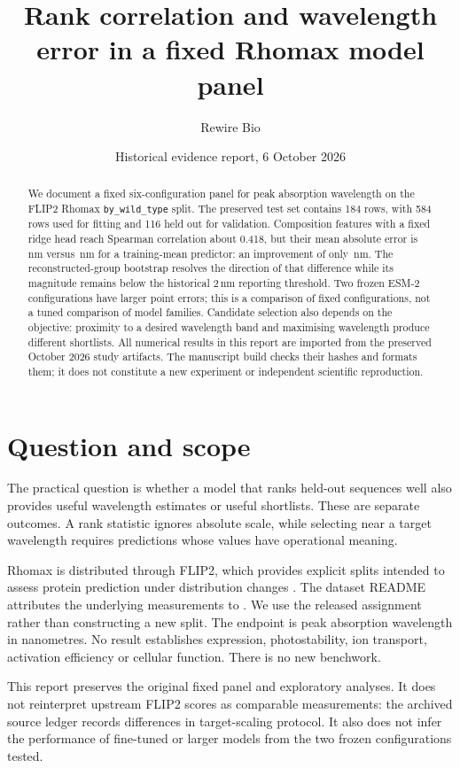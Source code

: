 \documentclass[11pt]{article}
\title{Rank correlation and wavelength error in a fixed Rhomax model panel}
\author{Rewire Bio}
\date{Historical evidence report, 6 October 2026}
\begin{document}
\maketitle
\begin{abstract}
We document a fixed six-configuration panel for peak absorption wavelength on the
FLIP2 Rhomax \texttt{by\_wild\_type} split. The preserved test set contains 184 rows,
with 584 rows used for fitting and 116 held out for validation. Composition features
with a fixed ridge head reach Spearman correlation about 0.418, but their mean
absolute error is \CompMAE\,nm versus \MeanMAE\,nm for a training-mean predictor:
an improvement of only \GainMAE\,nm. The reconstructed-group bootstrap resolves
the direction of that difference while its magnitude remains below the historical
2\,nm reporting threshold. Two frozen ESM-2 configurations have larger point errors;
this is a comparison of fixed configurations, not a tuned comparison of model
families. Candidate selection also depends on the objective: proximity to a desired
wavelength band and maximising wavelength produce different shortlists. All numerical
results in this report are imported from the preserved October 2026 study artifacts.
The manuscript build checks their hashes and formats them; it does not constitute
a new experiment or independent scientific reproduction.
\end{abstract}

\section{Question and scope}
The practical question is whether a model that ranks held-out sequences well also
provides useful wavelength estimates or useful shortlists. These are separate outcomes.
A rank statistic ignores absolute scale, while selecting near a target wavelength
requires predictions whose values have operational meaning.

Rhomax is distributed through FLIP2, which provides explicit splits intended to assess
protein prediction under distribution changes \citep{flip2}. The dataset README
attributes the underlying measurements to \citet{inoue2021}. We use the released
assignment rather than constructing a new split. The endpoint is peak absorption
wavelength in nanometres. No result establishes expression, photostability, ion
transport, activation efficiency or cellular function. There is no new benchwork.

This report preserves the original fixed panel and exploratory analyses. It does not
reinterpret upstream FLIP2 scores as comparable measurements: the archived source
ledger records differences in target-scaling protocol. It also does not infer the
performance of fine-tuned or larger models from the two frozen configurations tested.
\end{document}
